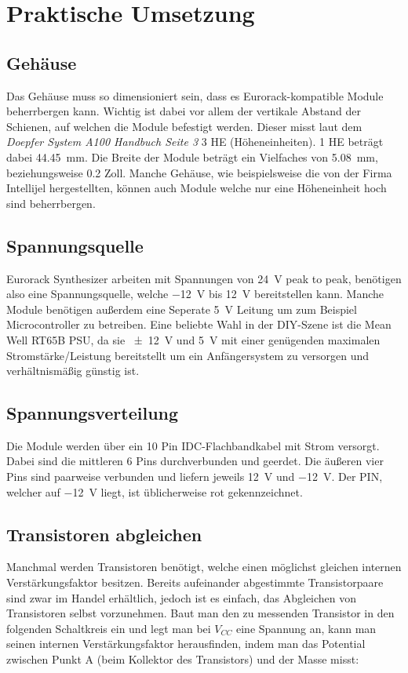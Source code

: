 \chapter{Praktische Umsetzung}

\section{Gehäuse}
\label{sec:org117f625}
Das Gehäuse muss so dimensioniert sein, dass es Eurorack-kompatible Module beherrbergen kann. Wichtig ist dabei vor allem der vertikale Abstand der Schienen, auf welchen die Module befestigt werden. Dieser misst laut dem \emph{Doepfer System A100 Handbuch Seite 3} 3 HE (Höheneinheiten). 1 HE beträgt dabei \SI{44.45}{\milli\meter}. Die Breite der Module beträgt ein Vielfaches von \SI{5.08}{\milli\meter}, beziehungsweise 0.2 Zoll. Manche Gehäuse, wie beispielsweise die von der Firma Intellijel hergestellten, können auch Module welche nur eine Höheneinheit hoch sind beherrbergen.

\section{Spannungsquelle}
\label{sec:org94bc363}
Eurorack Synthesizer arbeiten mit Spannungen von \SI{24}{\volt} peak to peak, benötigen also eine Spannungsquelle, welche \SI{-12}{\volt} bis \SI{+12}{\volt} bereitstellen kann. Manche Module benötigen außerdem eine Seperate \SI{5}{\volt} Leitung um zum Beispiel Microcontroller zu betreiben. Eine beliebte Wahl in der DIY-Szene ist die Mean Well RT65B PSU, da sie \SI{\pm 12}{\volt} und \SI{5}{\volt} mit einer genügenden maximalen Stromstärke/Leistung bereitstellt um ein Anfängersystem zu versorgen und verhältnismäßig günstig ist.

\section{Spannungsverteilung}
\label{sec:orgee26b5a}
Die Module werden über ein 10 Pin IDC-Flachbandkabel mit Strom versorgt. Dabei sind die mittleren 6 Pins durchverbunden und geerdet. Die äußeren vier Pins sind paarweise verbunden und liefern jeweils \SI{+12}{\volt} und \SI{-12}{\volt}. Der PIN, welcher auf \SI{-12}{\volt} liegt, ist üblicherweise rot gekennzeichnet.

\section{Transistoren abgleichen}
\label{sec:org4aacd0e}
Manchmal werden Transistoren benötigt, welche einen möglichst gleichen internen Verstärkungsfaktor besitzen. Bereits aufeinander abgestimmte Transistorpaare sind zwar im Handel erhältlich, jedoch ist es einfach, das Abgleichen von Transistoren selbst vorzunehmen. Baut man den zu messenden Transistor in den folgenden Schaltkreis ein und legt man bei \(V_{CC}\) eine Spannung an, kann man seinen internen Verstärkungsfaktor herausfinden, indem man das Potential zwischen Punkt A (beim Kollektor des Transistors) und der Masse misst:

